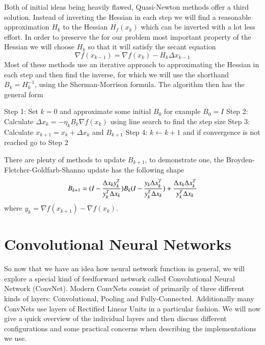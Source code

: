 \documentclass[preprint,12pt,3p]{elsarticle}
\begin{document}
Both of initial ideas being heavily flawed, Quasi-Newton methods offer a third solution. Instead of inverting the Hessian in each step we will find a reasonable approximation $H_k$ to the Hessian $H_f(x_k)$ which can be inverted with a lot less effort. In order to preserve the for our problem most important property of the Hessian we will choose $H_k$ so that it will satisfy the secant equation
$$\nabla f(x_{k-1})=\nabla f(x_k)-H_k\Delta x_{k-1}$$ 
Most of these methods use an iterative approach to approximating the Hessian in each step and then find the inverse, for which we will use the shorthand $B_k=H_k^{-1}$, using the Sherman-Morrison formula.
The algorithm then has the general form
\vspace{0.4cm}
\begin{algorithmic}
\State Step 1: Set $k=0$ and approximate some initial $B_0$ for example $B_0=I$
\vspace{0.3cm}
\State Step 2: Calculate $\Delta x_k=-\eta_kB_k\nabla f(x_k)$ using line search to find the step size
\vspace{0.3cm}
\State Step 3: Calculate $x_{k+1}=x_k+\Delta x_k$ and $B_{k+1}$
\vspace{0.3cm}
\State Step 4: $k\gets k+1$ and if convergence is not reached go to Step 2
\vspace{0.3cm}
\end{algorithmic}
\vspace{0.4cm}
There are plenty of methods to update $B_{k+1}$, to demonstrate one, the Broyden-Fletcher-Goldfarb-Shanno update \cite{roger1987practical} has the following shape
\begin{align*}
    B_{k+1}=\Large(I-\frac{\Delta x_k y_k^T}{y_k^T\Delta x_k}\Large)B_k\Large(I-\frac{y_k\Delta x_k^T}{y_k^T\Delta x_k}\Large)+\frac{\Delta x_k\Delta x_k^T}{y_k^T\Delta x_k}
\end{align*}
where $y_k=\nabla f(x_{k+1})-\nabla f(x_k)$.



\section{Convolutional Neural Networks}

So now that we have an idea how neural network function in general, we will explore a special kind of feedforward network called Convolutional Neural Network (ConvNet). Modern ConvNets consist of primarily of three different kinds of layers: Convolutional, Pooling and Fully-Connected. Additionally many ConvNets use layers of Rectified Linear Units in a particular fashion. We will now give a quick overview of the individual layers and then discuss different configurations and some practical concerns when describing the implementations we use. 
\end{document}
